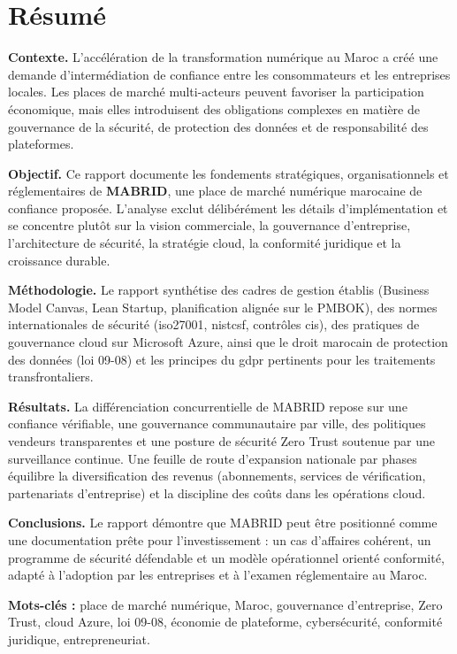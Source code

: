 \chapter*{Résumé}

\textbf{Contexte.} L'accélération de la transformation numérique au Maroc a créé une demande d'intermédiation de confiance entre les consommateurs et les entreprises locales. Les places de marché multi-acteurs peuvent favoriser la participation économique, mais elles introduisent des obligations complexes en matière de gouvernance de la sécurité, de protection des données et de responsabilité des plateformes.

\textbf{Objectif.} Ce rapport documente les fondements stratégiques, organisationnels et réglementaires de \textbf{MABRID}, une place de marché numérique marocaine de confiance proposée. L'analyse exclut délibérément les détails d'implémentation et se concentre plutôt sur la vision commerciale, la gouvernance d'entreprise, l'architecture de sécurité, la stratégie cloud, la conformité juridique et la croissance durable.

\textbf{Méthodologie.} Le rapport synthétise des cadres de gestion établis (Business Model Canvas, Lean Startup, planification alignée sur le PMBOK), des normes internationales de sécurité (\gls{iso27001}, \gls{nistcsf}, contrôles \gls{cis}), des pratiques de gouvernance cloud sur Microsoft Azure, ainsi que le droit marocain de protection des données (loi 09-08) et les principes du \gls{gdpr} pertinents pour les traitements transfrontaliers.

\textbf{Résultats.} La différenciation concurrentielle de MABRID repose sur une confiance vérifiable, une gouvernance communautaire par ville, des politiques vendeurs transparentes et une posture de sécurité Zero Trust soutenue par une surveillance continue. Une feuille de route d'expansion nationale par phases équilibre la diversification des revenus (abonnements, services de vérification, partenariats d'entreprise) et la discipline des coûts dans les opérations cloud.

\textbf{Conclusions.} Le rapport démontre que MABRID peut être positionné comme une documentation prête pour l'investissement : un cas d'affaires cohérent, un programme de sécurité défendable et un modèle opérationnel orienté conformité, adapté à l'adoption par les entreprises et à l'examen réglementaire au Maroc.

\vspace{0.8cm}
\noindent\textbf{Mots-clés :} place de marché numérique, Maroc, gouvernance d'entreprise, Zero Trust, cloud Azure, loi 09-08, économie de plateforme, cybersécurité, conformité juridique, entrepreneuriat.
